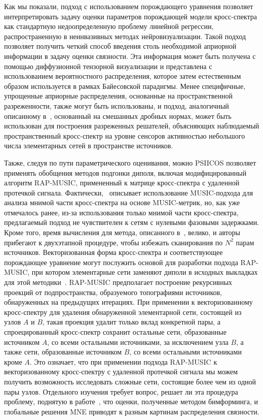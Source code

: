 Как мы показали, подход с использованием порождающего уравнения позволяет
интерпретировать задачу оценки параметров порождающей модели кросс-спектра как
стандартную недоопределенную проблему линейной регрессии, распространенную в
неинвазивных методах нейровизуализации. Такой подход позволяет получить четкий
способ введения столь необходимой априорной информации в задачу оценки
связности. Эта информация может быть получена с помощью диффузионной тензорной
визуализации и представлена с использованием вероятностного распределения,
которое затем естественным образом используется в рамках Байесовской парадигмы.
Менее специфичные, упрощенные априорные распределения, основанные на
пространственной разреженности, также могут быть использованы, и подход,
аналогичный описанному в~\cite{Gramfort2014}, основанный на смешанных
дробных нормах, может быть использован для построения разреженных решателей,
объясняющих наблюдаемый пространственный кросс-спектр на уровне сенсоров
активностью небольшого числа элементарных сетей в пространстве источников.

Также, следуя по пути параметрического оценивания, можно PSIICOS позволяет
применять обобщения методов подгонки диполя, включая модифицированный алгоритм
RAP-MUSIC, примененный к матрице кросс-спектра с удаленной протечкой сигнала.
Фактически,~\cite{wedgemusic} описывает использование MUSIC-подхода для анализа
мнимой части кросс-спектра на основе MUSIC-метрик, но, как уже отмечалось
ранее, из-за использования только мнимой части кросс-спектра, предлагаемый
подход не чувствителен к сетям с нулевыми фазовыми задержками. Кроме того,
время вычисления для метода, описанного в~\cite{wedgemusic}, велико, и авторы
прибегают к двухэтапной процедуре, чтобы избежать сканирования по $N^2$ парам
источников.  Векторизованная форма кросс-спектра и соответствующее порождающее
уравнение могут послужить основой для разработки подхода RAP-MUSIC, при котором
элементарные сети заменяют диполи в исходных выкладках для этой методики~\cite{Mosher1999}.
RAP-MUSIC предполагает построение рекурсивных проекций от
подпространства, образуемого топографиями источников, обнаруженных на
предыдущих итерациях. При применении к векторизованному кросс-спектру для
удаления обнаруженной элементарной сети, состоящей из узлов $A$ и $B$, такая
проекция удалит только вклад конкретной пары, а спроецированный кросс-спектр
сохранит остальные сети, образованные источником $A$, со всеми остальными
источниками, за исключением узла $B$, а также сети, образованные источником $B$, со
всеми остальными источниками кроме $A$. Это означает, что при применении подхода
RAP-MUSIC к векторизованному кросс-спектру с удаленной протечкой сигнала мы
можем получить возможность исследовать сложные сети, состоящие более чем из
одной пары узлов. Отдельного изучения требует вопрос, решает ли эта процедура
проблему, поднятую в работе~\cite{Mahjoory2017}, что оценки, полученные
методом бимформинга, и глобальные решения MNE приводят к разным картинам
распределения связности.

